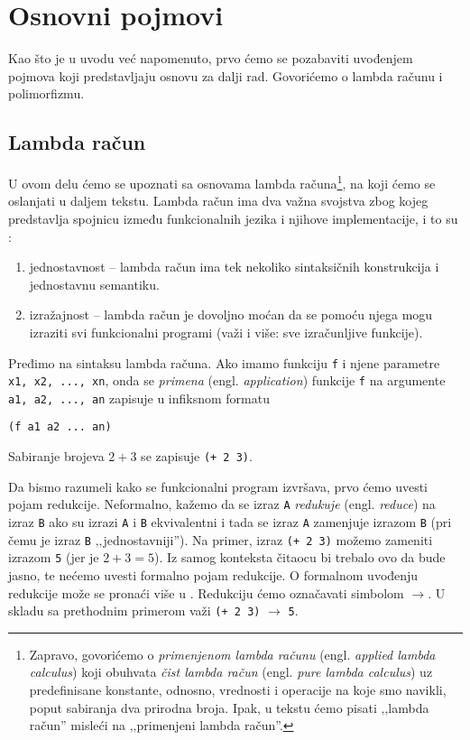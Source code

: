 \section{Osnovni pojmovi}
\label{sec:osnovni pojmovi}

Kao što je u uvodu već napomenuto, prvo ćemo se pozabaviti uvođenjem pojmova koji predstavljaju osnovu za dalji rad. Govorićemo o lambda računu i polimorfizmu.

\subsection{Lambda račun}
\label{subsec:lambda racun}

U ovom delu ćemo se upoznati sa osnovama lambda računa\footnote{Zapravo, govorićemo o \textit{primenjenom lambda računu} (engl. \textit{applied lambda calculus}) koji obuhvata \textit{čist lambda račun} (engl. \textit{pure lambda calculus}) uz predefinisane konstante, odnosno, vrednosti i operacije na koje smo navikli, poput sabiranja dva prirodna broja. Ipak, u tekstu ćemo pisati ‚‚lambda račun'' misleći na ‚‚primenjeni lambda račun''.}, na koji ćemo se oslanjati u daljem tekstu. Lambda račun ima dva važna svojstva zbog kojeg predstavlja spojnicu između funkcionalnih jezika i njihove implementacije, i to su \cite{the-implementation-of-functional-programming-languages}:
\begin{enumerate}
	\item jednostavnost -- lambda račun ima tek nekoliko sintaksičnih konstrukcija i jednostavnu semantiku.
	\item izražajnost -- lambda račun je dovoljno moćan da se pomoću njega mogu izraziti svi funkcionalni programi (važi i više: sve izračunljive funkcije).
\end{enumerate}

Pređimo na sintaksu lambda računa. Ako imamo funkciju \verb|f| i njene parametre \verb|x1, x2, ..., xn|, onda se \textit{primena} (engl. \textit{application}) funkcije \verb|f| na argumente \verb|a1, a2, ..., an| zapisuje u infiksnom formatu
\begin{center}
	\verb|(f a1 a2 ... an)|
\end{center}

\begin{primer}
	Sabiranje brojeva $2+3$ se zapisuje \verb|(+ 2 3)|.
\end{primer}

Da bismo razumeli kako se funkcionalni program izvršava, prvo ćemo uvesti pojam redukcije. Neformalno, kažemo da se izraz \verb|A| \textit{redukuje} (engl. \textit{reduce}) na izraz \verb|B| ako su izrazi \verb|A| i \verb|B| ekvivalentni i tada se izraz \verb|A| zamenjuje izrazom \verb|B| (pri čemu je izraz \verb|B| ‚‚jednostavniji''). Na primer, izraz \verb|(+ 2 3)| možemo zameniti izrazom \verb|5| (jer je $2+3=5$). Iz samog konteksta čitaocu bi trebalo ovo da bude jasno, te nećemo uvesti formalno pojam redukcije. O formalnom uvođenju redukcije može se pronaći više u \cite{foundations-of-functional-programming}. Redukciju ćemo označavati simbolom $\rightarrow$. U skladu sa prethodnim primerom važi \verb|(+ 2 3)| $\rightarrow$ \verb|5|.

